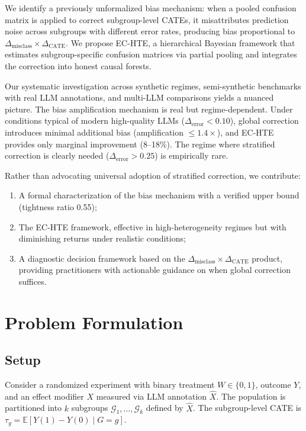 \documentclass[11pt,a4paper]{article}
\begin{document}
We identify a previously unformalized bias mechanism: when a pooled confusion matrix is applied to correct subgroup-level CATEs, it misattributes prediction noise across subgroups with different error rates, producing bias proportional to $\Delta_{\text{misclass}} \times \Delta_{\text{CATE}}$. We propose EC-HTE, a hierarchical Bayesian framework that estimates subgroup-specific confusion matrices via partial pooling and integrates the correction into honest causal forests.

Our systematic investigation across synthetic regimes, semi-synthetic benchmarks with real LLM annotations, and multi-LLM comparisons yields a nuanced picture. The bias amplification mechanism is real but regime-dependent. Under conditions typical of modern high-quality LLMs ($\Delta_{\text{error}} < 0.10$), global correction introduces minimal additional bias (amplification $\leq 1.4\times$), and EC-HTE provides only marginal improvement (8--18\%). The regime where stratified correction is clearly needed ($\Delta_{\text{error}} > 0.25$) is empirically rare.

Rather than advocating universal adoption of stratified correction, we contribute:
\begin{enumerate}
    \item A formal characterization of the bias mechanism with a verified upper bound (tightness ratio 0.55);
    \item The EC-HTE framework, effective in high-heterogeneity regimes but with diminishing returns under realistic conditions;
    \item A diagnostic decision framework based on the $\Delta_{\text{misclass}} \times \Delta_{\text{CATE}}$ product, providing practitioners with actionable guidance on when global correction suffices.
\end{enumerate}


\section{Problem Formulation}

\subsection{Setup}

Consider a randomized experiment with binary treatment $W \in \{0,1\}$, outcome $Y$, and an effect modifier $X$ measured via LLM annotation $\hat{X}$. The population is partitioned into $k$ subgroups $\mathcal{G}_1, \ldots, \mathcal{G}_k$ defined by $\hat{X}$. The subgroup-level CATE is $\tau_g = \mathbb{E}[Y(1) - Y(0) \mid G = g]$.
\end{document}
